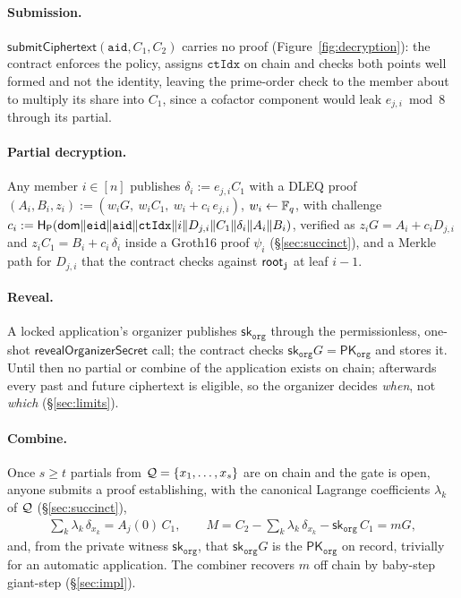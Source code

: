 \paragraph{Submission.} $\mathsf{submitCiphertext}(\mathtt{aid}, C_1, C_2)$ carries no proof (Figure~\ref{fig:decryption}): the contract enforces the policy, assigns $\mathtt{ctIdx}$ on chain and checks both points well formed and not the identity, leaving the prime-order check to the member about to multiply its share into $C_1$, since a cofactor component would leak $e_{j,i} \bmod 8$ through its partial.

\paragraph{Partial decryption.} Any member $i \in [n]$ publishes $\delta_i := e_{j,i} C_1$ with a DLEQ proof \cite{chaum1992wallet} $(A_i, B_i, z_i) := (w_i G,\ w_i C_1,\ w_i + c_i\, e_{j,i})$, $w_i \leftarrow \mathbb{F}_q$, with challenge $c_i := \mathsf{H}_{\mathsf{P}}(\mathsf{dom} \| \mathtt{eid} \| \mathtt{aid} \| \mathtt{ctIdx} \| i \|\allowbreak D_{j,i} \| C_1 \| \delta_i \| A_i \| B_i)$, verified as $z_i G = A_i + c_i D_{j,i}$ and $z_i C_1 = B_i + c_i\,\delta_i$ inside a Groth16 proof $\psi_i$ (\S\ref{sec:succinct}), and a Merkle path for $D_{j,i}$ that the contract checks against $\mathsf{root}_{\mathtt{j}}$ at leaf $i - 1$.

\paragraph{Reveal.} A locked application's organizer publishes $\mathsf{sk}_{\mathtt{org}}$ through the permissionless, one-shot $\mathsf{revealOrganizerSecret}$ call; the contract checks $\mathsf{sk}_{\mathtt{org}} G = \mathsf{PK}_{\mathtt{org}}$ and stores it. Until then no partial or combine of the application exists on chain; afterwards every past and future ciphertext is eligible, so the organizer decides \emph{when}, not \emph{which} (\S\ref{sec:limits}).

\paragraph{Combine.} Once $s \ge t$ partials from $\mathcal{Q} = \{x_1, \dots, x_s\}$ are on chain and the gate is open, anyone submits a proof establishing, with the canonical Lagrange coefficients $\lambda_k$ of $\mathcal{Q}$ (\S\ref{sec:succinct}),
\begin{align}
    \sum_{k} \lambda_k\, \delta_{x_k} = A_j(0)\, C_1, \qquad
    M = C_2 - \sum_k \lambda_k\, \delta_{x_k} - \mathsf{sk}_{\mathtt{org}}\, C_1 = mG,
    \label{eq:combine}
\end{align}
and, from the private witness $\mathsf{sk}_{\mathtt{org}}$, that $\mathsf{sk}_{\mathtt{org}} G$ is the $\mathsf{PK}_{\mathtt{org}}$ on record, trivially for an automatic application. The combiner recovers $m$ off chain by baby-step giant-step \cite{shanks1971class} (\S\ref{sec:impl}).

